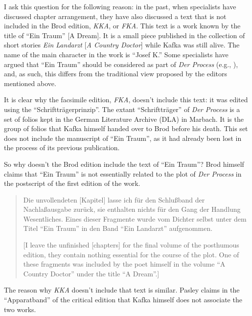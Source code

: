 \begin{paper}
I ask this question for the following reason: in the past, when
specialists have discussed chapter arrangement, they have also discussed
a text that is not included in the Brod edition, \emph{KKA}, or
\emph{FKA}. This text is a work known by the title of ``Ein Traum''
{[}A Dream{]}. It is a small piece published in the collection of
short stories \emph{Ein Landarzt} {[}\emph{A Country Doctor}{]} while
Kafka was still alive. The name of the main character in the work is
``Josef K.'' Some specialists have argued that ``Ein Traum'' should be
considered as part of \emph{Der Process} (e.g., \cite{binder_kafka-kommentar_1976}), and, as
such, this differs from the traditional view proposed by the editors
mentioned above.

It is clear why the facsimile edition, \emph{FKA}, doesn't include this
text: it was edited using the ``Schriftträgerprinzip''. The extant
``Schriftträger'' of \emph{Der Process} is a set of folios kept in the
German Literature Archive (DLA) in Marbach. It is the group of folios
that Kafka himself handed over to Brod before his death. This set does
not include the manuscript of ``Ein Traum'', as it had already been lost
in the process of its previous publication.

So why doesn't the Brod edition include the text of ``Ein Traum''? Brod
himself claims that ``Ein Traum'' is not essentially related to the plot
of \emph{Der Process} in the postscript of the first edition of the
work.

\begin{quote}
Die unvollendeten {[}Kapitel{]} lasse ich für den Schlußband der
Nachlaßausgabe zurück, sie enthalten nichts für den Gang der Handlung
Wesentliches. Eines dieser Fragmente wurde vom Dichter selbst unter dem
Titel ``Ein Traum'' in den Band ``Ein Landarzt'' aufgenommen.

\begin{flushright}
    \parencite[323]{kafka_prozess_1946}
\end{flushright}

{[}I leave the unfinished {[}chapters{]} for the final volume of the
posthumous edition, they contain nothing essential for the course of the
plot. One of these fragments was included by the poet himself in the
volume ``A Country Doctor'' under the title ``A Dream''.{]}
\end{quote}

The reason why \emph{KKA} doesn't include that text is similar. Pasley
claims in the ``Apparatband'' of the critical edition that Kafka himself
does not associate the two works.


\end{paper}
